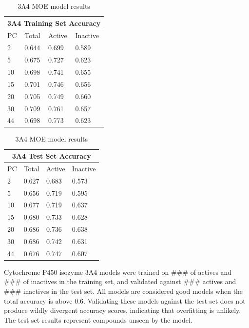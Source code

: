 \begin{table}[!h]
\begin{minipage}{.5\linewidth}
\centering
\begin{tabular}{|l|l|l|l|}
\hline
\multicolumn{4}{|c|}{3A4 Training Set Accuracy} \\ \hline
PC & Total          & Active          & Inactive \\ \hline
2  & 0.644          & 0.699           & 0.589   \\ \hline
5  & 0.675          & 0.727           & 0.623   \\ \hline
10 & 0.698          & 0.741           & 0.655   \\ \hline
15 & 0.701          & 0.746           & 0.656   \\ \hline
20 & 0.705          & 0.749           & 0.660   \\ \hline
30 & 0.709          & 0.761           & 0.657   \\ \hline
44 & 0.698          & 0.773           & 0.623   \\ \hline
\end{tabular}
\end{minipage}
\begin{minipage}{.5\linewidth}
\centering
\begin{tabular}{|l|l|l|l|}
\hline
\multicolumn{4}{|c|}{3A4 Test Set Accuracy}      \\ \hline
PC & Total          & Active          & Inactive \\ \hline
2  & 0.627          & 0.683           & 0.573    \\ \hline
5  & 0.656          & 0.719           & 0.595    \\ \hline
10 & 0.677          & 0.719           & 0.637    \\ \hline
15 & 0.680          & 0.733           & 0.628    \\ \hline
20 & 0.686          & 0.736           & 0.638    \\ \hline
30 & 0.686          & 0.742           & 0.631    \\ \hline
44 & 0.676          & 0.747           & 0.607    \\ \hline
\end{tabular}
\end{minipage}
\caption{3A4 MOE model results}
\end{table}

Cytochrome P450 isozyme 3A4 models were trained on ### of actives and ### of inactives in the training set, and validated against ### actives and ### inactives in the test set. All models are considered good models when the  total accuracy is above 0.6. Validating these models against the test set does not produce wildly divergent accuracy scores, indicating that overfitting is unlikely. The test set results represent compounds unseen by the model. 

